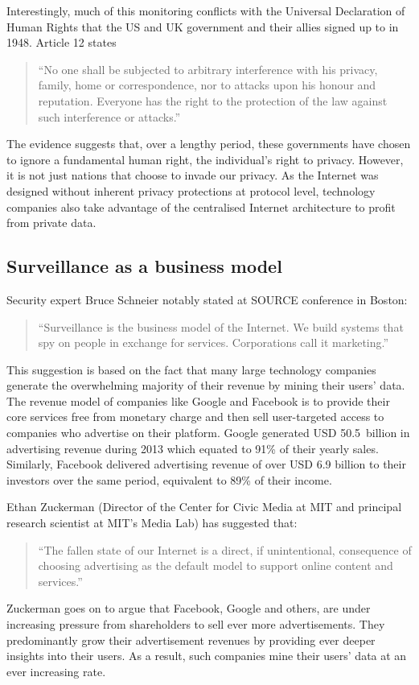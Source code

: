 \documentclass[twocolumn,english]{article}
\begin{document}
Interestingly, much of this monitoring conflicts with the Universal
Declaration of Human Rights that the US and UK government and their
allies signed up to in 1948. Article 12 states\cite{unhrd12}
\begin{quote}
\textquotedblleft No one shall be subjected to arbitrary interference
with his privacy, family, home or correspondence, nor to attacks upon
his honour and reputation. Everyone has the right to the protection
of the law against such interference or attacks.\textquotedblright
\end{quote}
The evidence suggests that, over a lengthy period, these governments
have chosen to ignore a fundamental human right, the individual's right
to privacy. However, it is not just nations that choose to invade
our privacy.  As the Internet was designed without inherent privacy protections at protocol level, technology companies also take advantage of the centralised Internet architecture to profit from private data.

\subsection{Surveillance as a business model }

Security expert Bruce Schneier notably stated at SOURCE conference in Boston:\cite{boston14}
\begin{quote}
\textquotedblleft Surveillance is the business model of the Internet. We build systems that spy on people in exchange for services. Corporations call it marketing.\textquotedblright
\end{quote}
This suggestion is based on the fact that many large technology
companies generate the overwhelming majority of their revenue by
mining their users' data. The revenue model of companies like Google
and Facebook is to provide their core services free from monetary
charge and then sell user-targeted access to companies who advertise on their platform. Google generated USD 50.5~billion in advertising
revenue during 2013 which equated to 91\% of their yearly sales\cite{google13}. Similarly, Facebook delivered advertising revenue of over USD 6.9
billion to their investors over the same period, equivalent to 89\%
of their income\cite{facebook13}. 

Ethan Zuckerman (Director of the Center for Civic Media at MIT and
principal research scientist at MIT\textquoteright s Media Lab) has
suggested that\cite{zuckerman14}:
\begin{quote}
\textquotedblleft The fallen state of our Internet is a direct, if
unintentional, consequence of choosing advertising as the default
model to support online content and services.\textquotedblright 
\end{quote}
Zuckerman goes on to argue that Facebook, Google and others, are under
increasing pressure from shareholders to sell ever more advertisements.
They predominantly grow their advertisement revenues by providing ever deeper insights into their users.  As a result, such companies mine their users' data at an ever increasing rate.
\end{document}
